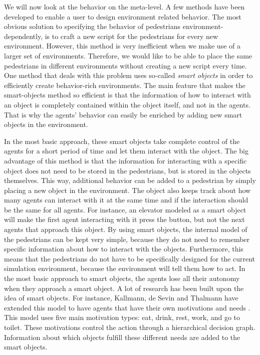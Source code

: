 \documentclass[11pt]{book}
\begin{document}
We will now look at the behavior on the meta-level. A few methods have been developed to enable a user to design environment related behavior. The most obvious solution to specifying the behavior of pedestrians environment-dependently, is to craft a new script for the pedestrians for every new environment. However, this method is very inefficient when we make use of a larger set of environments. Therefore, we would like to be able to place the same pedestrians in different environments without creating a new script every time.  One method that deals with this problem uses so-called \emph{smart objects} in order to efficiently create behavior-rich environments. The main feature that makes the smart-objects method so efficient is that the information of how to interact with an object is completely contained within the object itself, and not in the agents. That is why the agents' behavior can easily be enriched by adding new smart objects in the environment.

In the most basic approach, these smart objects take complete control of the agents for a short period of time and let them interact with the object. The big advantage of this method is that the information for interacting with a specific object does not need to be stored in the pedestrians, but is stored in the objects themselves. This way, additional behavior can be added to a pedestrian by simply placing a new object in the environment.  The object also keeps track about how many agents can interact with it at the same time and if the interaction should be the same for all agents. For instance, an elevator modeled as a smart object will make the first agent interacting with it press the button, but not the next agents that approach this object. By using smart objects, the internal model of the pedestrians can be kept very simple, because they do not need to remember specific information about how to interact with the objects. Furthermore, this means that the pedestrians do not have to be specifically designed for the current simulation environment, because the environment will tell them how to act. In the most basic approach to smart objects, the agents lose all their autonomy when they approach a smart object. A lot of research has been built upon the idea of smart objects. For instance, Kallmann, de Sevin and Thalmann have extended this model to have agents that have their own motivations and needs \cite{Kallmann00constructingvirtual}. This model uses five main motivation types: eat, drink, rest, work, and go to toilet. These motivations control the action through a hierarchical decision graph. Information about which objects fulfill these different needs are added to the smart objects.\\
\end{document}
